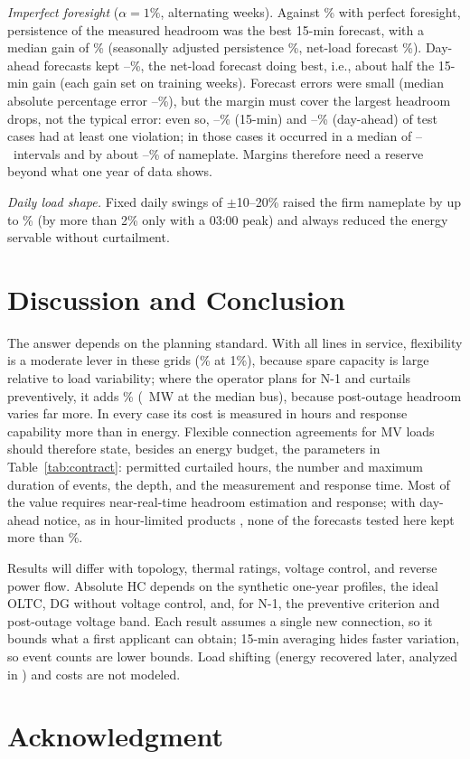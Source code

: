 \documentclass[conference,letterpaper]{IEEEtran}
\begin{document}
\emph{Imperfect foresight} ($\alpha=1\%$, alternating weeks). Against \poolGcmed\% with perfect foresight, persistence of the measured headroom was the best 15-min forecast, with a median gain of \fcPFifteengain\% (seasonally adjusted persistence \fcSAFifteengain\%, net-load forecast \fcNLFifteengain\%). Day-ahead forecasts kept \fcRangeDagainLo--\fcRangeDagainHi\%, the net-load forecast doing best, i.e., about half the 15-min gain (each gain set on training weeks). Forecast errors were small (median absolute percentage error \fcMapeLo--\fcMapeHi\%), but the margin must cover the largest headroom drops, not the typical error: even so, \fcRangeFifteenviolLo--\fcRangeFifteenviolHi\% (15-min) and \fcRangeDaviolLo--\fcRangeDaviolHi\% (day-ahead) of test cases had at least one violation; in those cases it occurred in a median of \fcVintLo--\fcVintHi~intervals and by about \fcExcLo--\fcExcHi\% of nameplate. Margins therefore need a reserve beyond what one year of data shows.

\emph{Daily load shape.} Fixed daily swings of $\pm$10--20\% raised the firm nameplate by up to \shpDCFoZatThfp\% (by more than 2\% only with a 03:00 peak) and always reduced the energy servable without curtailment.

\section{Discussion and Conclusion}
The answer depends on the planning standard. With all lines in service, flexibility is a moderate lever in these grids (\poolGcmed\% at 1\%), because spare capacity is large relative to load variability; where the operator plans for N-1 and curtails preventively, it adds \sensNmogO\% (\ctNadd~MW at the median bus), because post-outage headroom varies far more. In every case its cost is measured in hours and response capability more than in energy. Flexible connection agreements for MV loads should therefore state, besides an energy budget, the parameters in Table~\ref{tab:contract}: permitted curtailed hours, the number and maximum duration of events, the depth, and the measurement and response time. Most of the value requires near-real-time headroom estimation and response; with day-ahead notice, as in hour-limited products \cite{tennet_tdtr}, none of the forecasts tested here kept more than \fcBestDagain\%.

Results will differ with topology, thermal ratings, voltage control, and reverse power flow. Absolute HC depends on the synthetic one-year profiles, the ideal OLTC, DG without voltage control, and, for N-1, the preventive criterion and post-outage voltage band. Each result assumes a single new connection, so it bounds what a first applicant can obtain; 15-min averaging hides faster variation, so event counts are lower bounds. Load shifting (energy recovered later, analyzed in \cite{gu2026hicss}) and costs are not modeled.

\section*{Acknowledgment}




\end{document}

